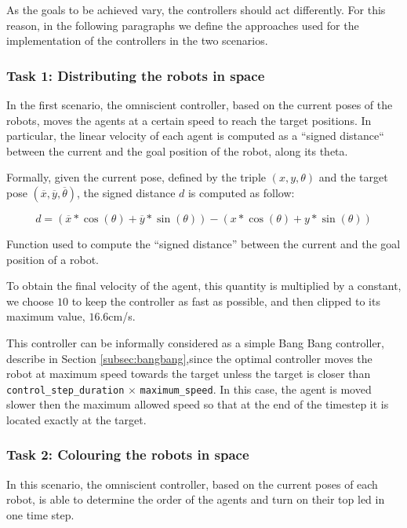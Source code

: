 As the goals to be achieved vary, the controllers should act differently. For this 
reason, in the following paragraphs we define the approaches used for the 
implementation of the controllers in the two scenarios.

\subsubsection{Task 1: Distributing the robots in space}

In the first scenario, the omniscient controller, based on the current poses of the 
robots, moves the agents at a certain speed to reach the target positions. In 
particular, the linear velocity of each agent is computed as a ``signed distance`` 
between the current and the goal position of the robot, along its theta. 

Formally, given the current pose, defined by the triple $(x, y, \theta)$ and the 
target pose $(\overline x, \overline y, \overline \theta)$, the signed distance $d$ 
is computed as follow:
\begin{Equation}[!htb]
	\centering
	\begin{equation}
	d = \left(\overline x * \cos (\theta) + \overline y * \sin (\theta)\right) -
	\left( x * \cos (\theta) + y * \sin (\theta)\right)
	\end{equation}
	\caption[Signed distance function.]{Function used to compute the ``signed 
		distance'' between the current and the goal position of a robot.}
	\label{eq:signeddist}
\end{Equation}

\noindent
To obtain the final velocity of the agent, this quantity is multiplied by a constant, 
we choose $10$ to keep the controller as fast as possible, and then clipped to its 
maximum value, $16.6$\gls{cm/s}.

This controller can be informally considered as a simple Bang Bang controller, 
describe in Section \ref{subsec:bangbang},since the optimal controller moves the 
robot at maximum speed towards the target unless the target is closer than 
\texttt{control\_step\_duration} $\times$ \texttt{maximum\_speed}. In this case, 
the agent is moved slower then the maximum allowed speed so that at the end of 
the timestep it is located exactly at the target.

\subsubsection{Task 2: Colouring the robots in space}
In this scenario, the omniscient controller, based on the current poses of each 
robot, is able to determine the order of the agents and turn on their top \gls{led}  
in one time step.

